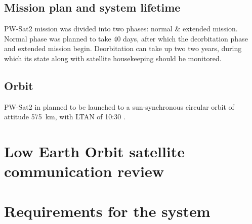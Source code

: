     \section{Mission plan and system lifetime}
        PW-Sat2 mission was divided into two phases: normal \& extended mission. Normal phase was planned to take 40 days, after which the deorbitation phase and extended mission begin. Deorbitation can  take up two two years, during which its state along with satellite housekeeping should be monitored.

    \section{Orbit}
        PW-Sat2 in planned to be launched to a sun-synchronous circular orbit of attitude \SI{575}{\kilo\meter}, with LTAN of 10:30 \cite{PWSAT_MA_CDR}.



\chapter{Low Earth Orbit satellite communication review}



\chapter{Requirements for the system}